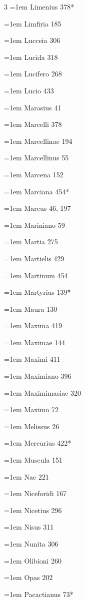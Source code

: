 \begin{multicols}{3}
\hangindent=1em Limenius 378*\par
\hangindent=1em Limfiria 185\par
\hangindent=1em Lucceia 306\par
\hangindent=1em Lucida 318\par
\hangindent=1em Lucifero 268\par
\hangindent=1em Lucio 433\par
\hangindent=1em Marasius 41\par
\hangindent=1em Marcelli 378\par
\hangindent=1em Marcellinae 194\par
\hangindent=1em Marcellinus 55\par
\hangindent=1em Marcena 152\par
\hangindent=1em Marciana 454*\par
\hangindent=1em Marcus 46, 197\par
\hangindent=1em Mariniano 59\par
\hangindent=1em Martia 275\par
\hangindent=1em Martielis 429\par
\hangindent=1em Martinum 454\par
\hangindent=1em Martyrius 139*\par
\hangindent=1em Maura 130\par
\hangindent=1em Maxima 419\par
\hangindent=1em Maximae 144\par
\hangindent=1em Maximi 411\par
\hangindent=1em Maximiano 396\par
\hangindent=1em Maximimasiae 320\par
\hangindent=1em Maximo 72\par
\hangindent=1em Melissus 26\par
\hangindent=1em Mercurius 422*\par
\hangindent=1em Muscula 151\par
\hangindent=1em Nae 221\par
\hangindent=1em Niceforidi 167\par
\hangindent=1em Nicetius 296\par
\hangindent=1em Nisus 311\par
\hangindent=1em Nunita 306\par
\hangindent=1em Olibioni 260\par
\hangindent=1em Opas 202\par
\hangindent=1em Pacactianus 73*\par

\end{multicols}
